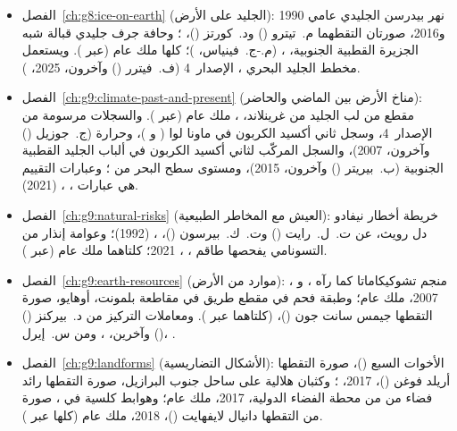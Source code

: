 \begin{itemize}
  \item الفصل~\ref{ch:g8:ice-on-earth} (الجليد على الأرض): نهر بيدرسن الجليدي عامي 1990 و2016، صورتان التقطهما م.~تيترو () ود.~كورتز ()، ؛ وحافة جرف جليدي قبالة شبه الجزيرة القطبية الجنوبية، ،  (م.-ج.~فينياس، )؛ كلها ملك عام (عبر ). ويستعمل مخطط الجليد البحري ، الإصدار~4 (ف.~فيترر () وآخرون، 2025، ).
  \item الفصل~\ref{ch:g9:climate-past-and-present} (مناخ الأرض بين الماضي والحاضر): مقطع من لب الجليد  من غرينلاند، ، ملك عام (عبر ). والسجلات مرسومة من  الإصدار~4، وسجل ثاني أكسيد الكربون في ماونا لوا ( و )، وحرارة  (ج.~جوزيل () وآخرون، 2007)، والسجل المركّب لثاني أكسيد الكربون في ألباب الجليد القطبية الجنوبية (ب.~بيريتر () وآخرون، 2015)، ومستوى سطح البحر من ؛ وعبارات التقييم هي عبارات ، ،  (2021).
  \item الفصل~\ref{ch:g9:natural-risks} (العيش مع المخاطر الطبيعية): خريطة أخطار نيفادو دل رويث، عن ت.~ل.~رايت () وت.~ك.~بيرسون ()، ،  (1992)؛ وعوامة إنذار من التسونامي يفحصها طاقم ، ، 2021؛ كلتاهما ملك عام (عبر ).
  \item الفصل~\ref{ch:g9:earth-resources} (موارد من الأرض): منجم تشوكيكاماتا كما رآه ،  و ، 2007، ملك عام؛ وطبقة فحم في مقطع طريق في مقاطعة بلمونت، أوهايو، صورة التقطها جيمس سانت جون ()،  (كلتاهما عبر ). ومعاملات التركيز من د.~بيركنز () وآخرين، ، ومن س.~إيرل ()، .
  \item الفصل~\ref{ch:g9:landforms} (الأشكال التضاريسية): الأخوات السبع ()، صورة التقطها أريلد فوغن ()، 2017، ؛ وكثبان هلالية على ساحل جنوب البرازيل، صورة التقطها رائد فضاء من  من محطة الفضاء الدولية، 2017، ملك عام؛ وهوابط كلسية في ، صورة من  التقطها دانيال لايفهايت ()، 2018، ملك عام (كلها عبر ).

\end{itemize}
